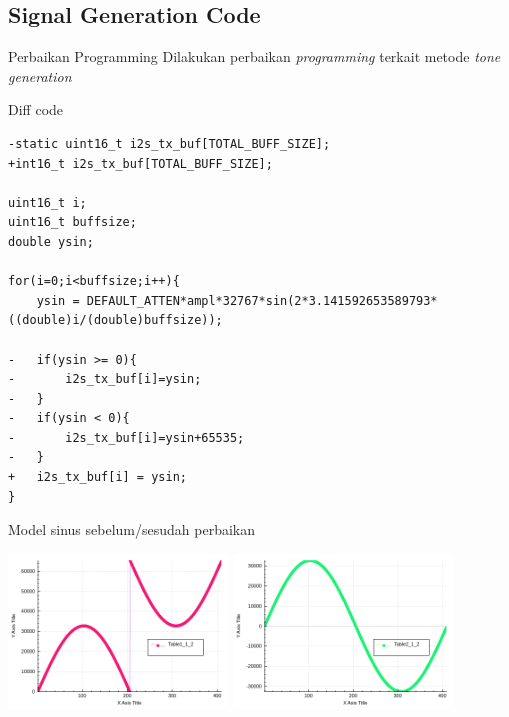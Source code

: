 \documentclass[table,dvipsnames]{beamer}
\begin{document}
	\begin{frame}[fragile]
		\subsection{Signal Generation Code}
		\begin{exampleblock}{Perbaikan Programming}
			Dilakukan perbaikan \textit{programming} terkait metode \textit{tone generation}
		\end{exampleblock}
	
		\begin{exampleblock}{Diff code}
			\begin{verbatim}
-static uint16_t i2s_tx_buf[TOTAL_BUFF_SIZE];
+int16_t i2s_tx_buf[TOTAL_BUFF_SIZE];

uint16_t i;
uint16_t buffsize;
double ysin;

for(i=0;i<buffsize;i++){
	ysin = DEFAULT_ATTEN*ampl*32767*sin(2*3.141592653589793*((double)i/(double)buffsize));
	
-	if(ysin >= 0){
-		i2s_tx_buf[i]=ysin;
-	}
-	if(ysin < 0){
-		i2s_tx_buf[i]=ysin+65535;
-	}
+ 	i2s_tx_buf[i] = ysin;
}
			\end{verbatim}
		\end{exampleblock}
	\end{frame}

	\begin{frame}
		\begin{exampleblock}{Model sinus sebelum/sesudah perbaikan}
			\begin{center}
				\includegraphics[width=165pt]{images/weird_sine}
				\includegraphics[width=165pt]{images/normal_sine}
			\end{center}
		\end{exampleblock}
	\end{frame}
\end{document}
